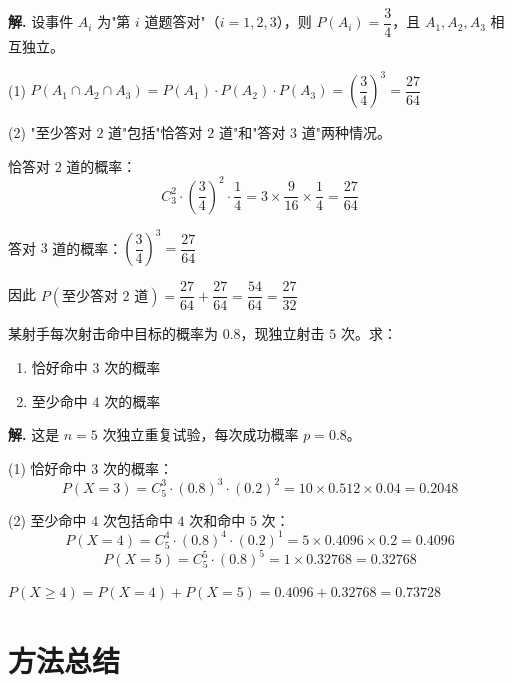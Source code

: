 \documentclass[11pt]{ctexrep}
\begin{document}
\textbf{解.} 设事件 $A_i$ 为"第 $i$ 道题答对"（$i = 1, 2, 3$），则 $P(A_i) = \dfrac{3}{4}$，且 $A_1, A_2, A_3$ 相互独立。

(1) $P(A_1 \cap A_2 \cap A_3) = P(A_1) \cdot P(A_2) \cdot P(A_3) = \left(\dfrac{3}{4}\right)^3 = \dfrac{27}{64}$

(2) "至少答对 $2$ 道"包括"恰答对 $2$ 道"和"答对 $3$ 道"两种情况。

恰答对 $2$ 道的概率：
\[
    C_3^2 \cdot \left(\dfrac{3}{4}\right)^2 \cdot \dfrac{1}{4} = 3 \times \dfrac{9}{16} \times \dfrac{1}{4} = \dfrac{27}{64}
\]

答对 $3$ 道的概率：$\left(\dfrac{3}{4}\right)^3 = \dfrac{27}{64}$

因此 $P(\text{至少答对 } 2 \text{ 道}) = \dfrac{27}{64} + \dfrac{27}{64} = \dfrac{54}{64} = \dfrac{27}{32}$

\begin{example}[独立重复试验]
    某射手每次射击命中目标的概率为 $0.8$，现独立射击 $5$ 次。求：
    \begin{enumerate}
        \item 恰好命中 $3$ 次的概率
        \item 至少命中 $4$ 次的概率
    \end{enumerate}
\end{example}

\textbf{解.} 这是 $n = 5$ 次独立重复试验，每次成功概率 $p = 0.8$。

(1) 恰好命中 $3$ 次的概率：
\[
    P(X = 3) = C_5^3 \cdot (0.8)^3 \cdot (0.2)^2 = 10 \times 0.512 \times 0.04 = 0.2048
\]

(2) 至少命中 $4$ 次包括命中 $4$ 次和命中 $5$ 次：
\[
    P(X = 4) = C_5^4 \cdot (0.8)^4 \cdot (0.2)^1 = 5 \times 0.4096 \times 0.2 = 0.4096
\]
\[
    P(X = 5) = C_5^5 \cdot (0.8)^5 = 1 \times 0.32768 = 0.32768
\]

$P(X \geq 4) = P(X = 4) + P(X = 5) = 0.4096 + 0.32768 = 0.73728$

\section*{方法总结}
\end{document}
